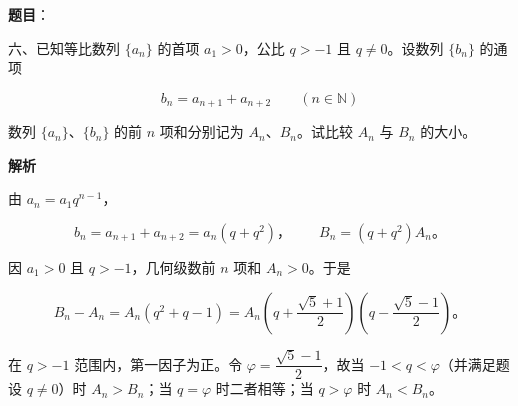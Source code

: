 \begin{answer}

\textbf{题目}：

六、已知等比数列 $\{a_n\}$ 的首项 $a_1>0$，公比 $q>-1$ 且 $q\ne0$。设数列 $\{b_n\}$ 的通项

\nopagebreak[4]
\[
b_n=a_{n+1}+a_{n+2}\qquad(n\in\mathbb N)
\]

数列 $\{a_n\}$、$\{b_n\}$ 的前 $n$ 项和分别记为 $A_n\text{、}B_n$。试比较 $A_n$ 与 $B_n$ 的大小。

\textbf{解析}

由 $a_n=a_1q^{n-1}$，

\nopagebreak[4]
\[
b_n=a_{n+1}+a_{n+2}=a_n(q+q^2)\text{，}\qquad B_n=(q+q^2)A_n\text{。}
\]

因 $a_1>0$ 且 $q>-1$，几何级数前 $n$ 项和 $A_n>0$。于是

\nopagebreak[4]
\[
B_n-A_n=A_n(q^2+q-1)
=A_n\left(q+\frac{\sqrt5+1}{2}\right)
\left(q-\frac{\sqrt5-1}{2}\right)\text{。}
\]

在 $q>-1$ 范围内，第一因子为正。令 $\varphi=\dfrac{\sqrt5-1}{2}$，故当 $-1<q<\varphi$（并满足题设 $q\ne0$）时 $A_n>B_n$；当 $q=\varphi$ 时二者相等；当 $q>\varphi$ 时 $A_n<B_n$。


\end{answer}
